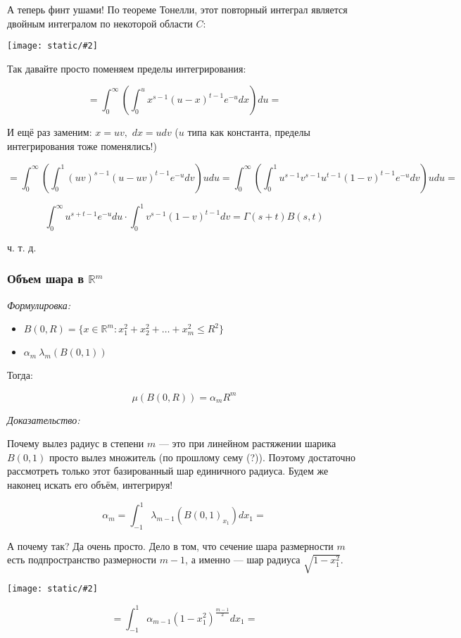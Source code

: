 \documentclass{article}
\def\dbl{\,\,}
\def\images#1#2{\begin{center}\texttt{[image: static/\#2]}\end{center}}
\begin{document}
А теперь финт ушами! По теореме Тонелли, этот повторный интеграл является двойным интегралом по некоторой области $C$:

\images{0.3}{betta.jpg}

Так давайте просто поменяем пределы интегрирования: 

\[= \int_{0}^{\infty} \left(\int_{0}^{u}x^{s - 1}(u - x)^{t - 1}e^{-u}dx\right)du = \]

И ещё раз заменим: $x = uv, \dbl dx = udv$ ($u$ типа как константа, пределы интегрирования тоже поменялись!)

\[= \int_{0}^{\infty} \left(\int_{0}^{1}(uv)^{s - 1}(u - uv)^{t - 1}e^{-u}dv\right)udu = \int_{0}^{\infty} \left(\int_{0}^{1}u^{s - 1}v^{s - 1}u^{t - 1}(1 - v)^{t - 1}e^{-u}dv\right)udu = \]

\[\int_{0}^{\infty}u^{s + t - 1}e^{-u} du \cdot \int_{0}^{1}v^{s - 1}(1 - v)^{t - 1}dv = \Gamma(s + t)B(s, t)\]

ч. т. д.

\subsubsection{Объем шара в $\mathbb{R}^m$}
\textit{Формулировка:}

\begin{itemize}
    \item $B(0, R) = \{x \in \mathbb{R}^{m}: x_1^{2} + x_2^{2} + \ldots + x_m^{2} \le R^{2}\}$
    \item $\alpha_{m} \ \lambda_{m}(B(0, 1))$
\end{itemize}

Тогда: 

\[\mu\left(B(0, R)\right) = \alpha_m R^{m}\]

\textit{Доказательство:}

Почему вылез радиус в степени $m$ --- это при линейном растяжении шарика $B(0, 1)$ просто вылез множитель (по прошлому сему (?)). Поэтому достаточно рассмотреть только этот базированный шар единичного радиуса. Будем же наконец искать его объём, интегрируя!

\[\alpha_m = \int_{-1}^{1} \lambda_{m - 1} \left(B(0, 1)_{x_1}\right) dx_1 = \]

А почему так? Да очень просто. Дело в том, что сечение шара размерности $m$ есть подпространство размерности $m - 1$, а именно --- шар радиуса $\sqrt{1 - x_1^2}$.

\images{0.5}{objom.jpg}

\[= \int_{-1}^{1} \alpha_{m - 1} (1 - x_1^2)^{\frac{m - 1}{2}} dx_1 = \]
\end{document}
